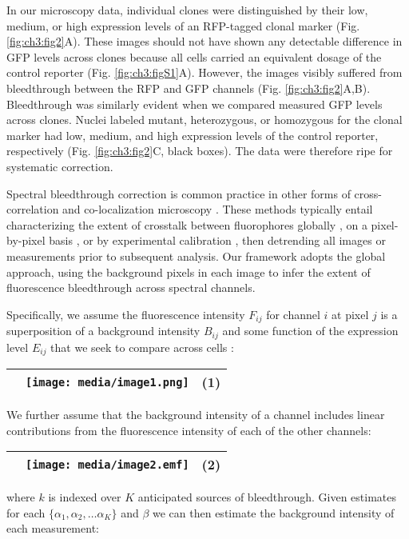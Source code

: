 In our microscopy data, individual clones were distinguished by their low, medium, or high expression levels of an RFP-tagged clonal marker (Fig. \ref{fig:ch3:fig2}A). These images should not have shown any detectable difference in GFP levels across clones because all cells carried an equivalent dosage of the control reporter (Fig. \ref{fig:ch3:figS1}A). However, the images visibly suffered from bleedthrough between the RFP and GFP channels (Fig. \ref{fig:ch3:fig2}A,B). Bleedthrough was similarly evident when we compared measured GFP levels across clones. Nuclei labeled mutant, heterozygous, or homozygous for the clonal marker had low, medium, and high expression levels of the control reporter, respectively (Fig. \ref{fig:ch3:fig2}C, black boxes). The data were therefore ripe for systematic correction.

Spectral bleedthrough correction is common practice in other forms of cross-correlation and co-localization microscopy \cite{Bacia2012,Zinchuk2007}. These methods typically entail characterizing the extent of crosstalk between fluorophores globally \cite{Arsenovic2017,Kim2013}, on a pixel-by-pixel basis \cite{Elangovan2003}, or by experimental calibration \cite{Bacia2012}, then detrending all images or measurements prior to subsequent analysis. Our framework adopts the global approach, using the background pixels in each image to infer the extent of fluorescence bleedthrough across spectral channels.

Specifically, we assume the fluorescence intensity $F_{ij}$ for channel $i$ at pixel $j$ is a superposition of a background intensity $B_{ij}$ and some function of the expression level $E_{ij}$ that we seek to compare across cells \cite{McMullen2010}:

\begin{longtable}[]{@{}lll@{}}
\toprule
& \texttt{[image: media/image1.png]} & (1)\tabularnewline
\bottomrule
\end{longtable}

We further assume that the background intensity of a channel includes linear contributions from the fluorescence intensity of each of the other channels:

\begin{longtable}[]{@{}lll@{}}
\toprule
& \texttt{[image: media/image2.emf]} & (2)\tabularnewline
\bottomrule
\end{longtable}

where $k$ is indexed over $K$ anticipated sources of bleedthrough. Given estimates for each $\{\alpha_1, \alpha_2, \ldots \alpha_K\}$ and $\beta$ we can then estimate the background intensity of each measurement:

